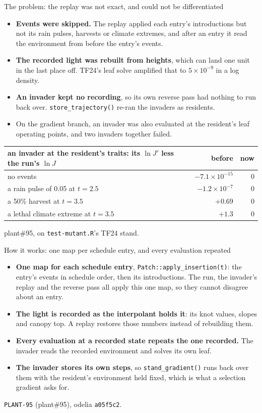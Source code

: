 \documentclass[aspectratio=169,10pt]{beamer}
\newcommand{\src}[1]{\par\vfill{\tiny\color{quiet} #1}}
\begin{document}
\begin{frame}{The problem: the replay was not exact, and could not be differentiated}
  \small
  \begin{itemize}
    \item \textbf{Events were skipped.} The replay applied each entry's introductions but not its
      rain pulses, harvests or climate extremes, and after an entry it read the environment from
      before the entry's events.
    \item \textbf{The recorded light was rebuilt from heights}, which can land one unit in the last
      place off. TF24's leaf solve amplified that to $5\times10^{-9}$ in a log density.
    \item \textbf{An invader kept no recording}, so its own reverse pass had nothing to run back
      over. \texttt{store\_trajectory()} re-ran the invaders as residents.
    \item On the gradient branch, an invader was also evaluated at the resident's leaf operating
      points, and two invaders together failed.
  \end{itemize}
  \medskip
  \centering
  \begin{tabular}{@{}lrr@{}}
    \toprule
    an invader at the resident's traits: its $\ln J'$ less the run's $\ln J$ & before & now \\
    \midrule
    no events & $-7.1\times10^{-15}$ & 0 \\
    a rain pulse of 0.05 at $t = 2.5$ & $-1.2\times10^{-7}$ & 0 \\
    a 50\% harvest at $t = 3.5$ & $+0.69$ & 0 \\
    a lethal climate extreme at $t = 3.5$ & $+1.3$ & 0 \\
    \bottomrule
  \end{tabular}
  \src{plant\#95, on \texttt{test-mutant.R}'s TF24 stand.}
\end{frame}

\begin{frame}{How it works: one map per schedule entry, and every evaluation repeated}
  \small
  \begin{itemize}
    \item \textbf{One map for each schedule entry}, \texttt{Patch::apply\_insertion(t)}: the
      entry's events in schedule order, then its introductions. The run, the invader's replay and
      the reverse pass all apply this one map, so they cannot disagree about an entry.
    \item \textbf{The light is recorded as the interpolant holds it}: its knot values, slopes and
      canopy top. A replay restores those numbers instead of rebuilding them.
    \item \textbf{Every evaluation at a recorded state repeats the one recorded.} The invader reads
      the recorded environment and solves its own leaf.
    \item \textbf{The invader stores its own steps}, so \texttt{stand\_gradient()} runs back over
      them with the resident's environment held fixed, which is what a selection gradient asks for.
  \end{itemize}
  \src{\texttt{PLANT-95} (plant\#95), odelia \texttt{a05f5c2}.}
\end{frame}
\end{document}
